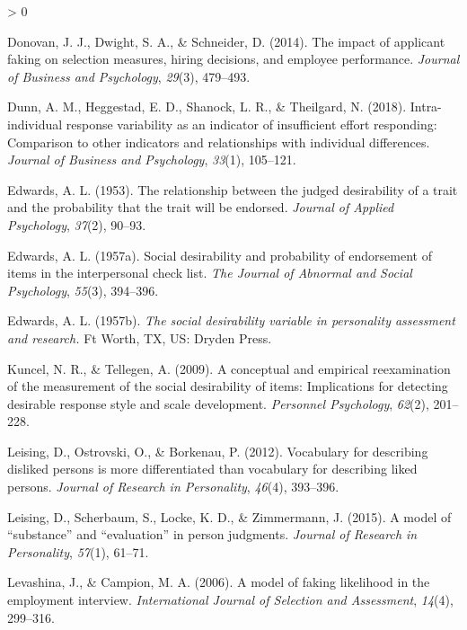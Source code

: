 \documentclass[
  english,
  ,jou]{apa6}
\newlength{\cslhangindent}
\newenvironment{CSLReferences}[2] %
 {%
  \setlength{\parindent}{0pt}
  \ifodd #1 \everypar{\setlength{\hangindent}{\cslhangindent}}\ignorespaces\fi
  \ifnum #2 > 0
  \setlength{\parskip}{#2\baselineskip}
  \fi
 }%
 {}
\begin{document}
\begin{CSLReferences}{1}{0}
\leavevmode\hypertarget{ref-donovan_impact_2014}{}%
Donovan, J. J., Dwight, S. A., \& Schneider, D. (2014). The impact of applicant faking on selection measures, hiring decisions, and employee performance. \emph{Journal of Business and Psychology}, \emph{29}(3), 479--493.

\leavevmode\hypertarget{ref-dunn_intra-individual_2018}{}%
Dunn, A. M., Heggestad, E. D., Shanock, L. R., \& Theilgard, N. (2018). Intra-individual response variability as an indicator of insufficient effort responding: Comparison to other indicators and relationships with individual differences. \emph{Journal of Business and Psychology}, \emph{33}(1), 105--121.

\leavevmode\hypertarget{ref-edwards_relationship_1953}{}%
Edwards, A. L. (1953). The relationship between the judged desirability of a trait and the probability that the trait will be endorsed. \emph{Journal of Applied Psychology}, \emph{37}(2), 90--93.

\leavevmode\hypertarget{ref-edwards_social_1957-4}{}%
Edwards, A. L. (1957a). Social desirability and probability of endorsement of items in the interpersonal check list. \emph{The Journal of Abnormal and Social Psychology}, \emph{55}(3), 394--396.

\leavevmode\hypertarget{ref-edwards_social_1957}{}%
Edwards, A. L. (1957b). \emph{The social desirability variable in personality assessment and research.} Ft Worth, TX, US: Dryden Press.

\leavevmode\hypertarget{ref-kuncel_conceptual_2009}{}%
Kuncel, N. R., \& Tellegen, A. (2009). A conceptual and empirical reexamination of the measurement of the social desirability of items: Implications for detecting desirable response style and scale development. \emph{Personnel Psychology}, \emph{62}(2), 201--228.

\leavevmode\hypertarget{ref-leising_vocabulary_2012}{}%
Leising, D., Ostrovski, O., \& Borkenau, P. (2012). Vocabulary for describing disliked persons is more differentiated than vocabulary for describing liked persons. \emph{Journal of Research in Personality}, \emph{46}(4), 393--396.

\leavevmode\hypertarget{ref-leising_model_2015}{}%
Leising, D., Scherbaum, S., Locke, K. D., \& Zimmermann, J. (2015). A model of {``substance''} and {``evaluation''} in person judgments. \emph{Journal of Research in Personality}, \emph{57}(1), 61--71.

\leavevmode\hypertarget{ref-levashina_model_2006}{}%
Levashina, J., \& Campion, M. A. (2006). A model of faking likelihood in the employment interview. \emph{International Journal of Selection and Assessment}, \emph{14}(4), 299--316.


\end{CSLReferences}
\end{document}
